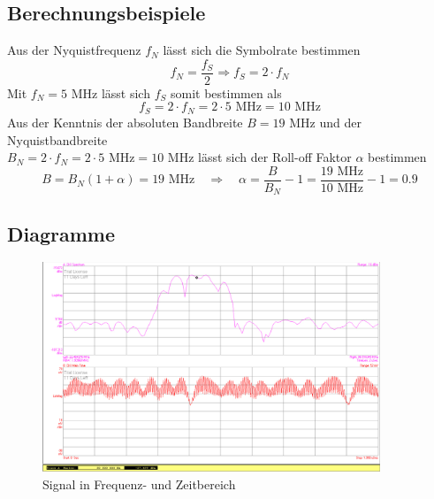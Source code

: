 \documentclass[12pt,a4paper,ngerman]{article}
\begin{document}
\subsection{Berechnungsbeispiele}
Aus der Nyquistfrequenz $f_N$ lässt sich die Symbolrate bestimmen
\begin{equation}
f_N = \frac{f_S}{2} \Rightarrow f_S = 2 \cdot f_N
\end{equation}
Mit $f_N = 5$ MHz lässt sich $f_S$ somit bestimmen als
\begin{equation}
f_S = 2 \cdot f_N = 2 \cdot 5 \text{ MHz} = 10 \text{ MHz}
\end{equation}
Aus der Kenntnis der absoluten Bandbreite $B = 19$ MHz und der Nyquistbandbreite \\ $B_N = 2 \cdot f_N = 2 \cdot 5 \text{ MHz} = 10$ MHz lässt sich der Roll-off Faktor $\alpha$ bestimmen
\begin{equation}
B = B_N(1+\alpha) = 19 \text{ MHz} \quad \Rightarrow \quad \alpha = \frac{B}{B_N} -1 = \frac{19 \text{ MHz}}{10 \text{ MHz}} -1 = 0.9
\end{equation}



\subsection{Diagramme}
\begin{figure}[H]
\centering
\includegraphics[width=0.9\textwidth]{figures/Aufgabe1_QPSK.jpg} 
\caption{Signal in Frequenz- und Zeitbereich}
\label{fig:1_sig}
\end{figure}
\end{document}
